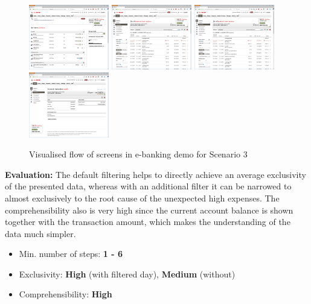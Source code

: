 \begin{figure}[h]
	\begin{center}
		\includegraphics[width=3.5cm]{03_Figures/09_Evaluation/UBS_1_Overview.png}
		\includegraphics[width=3.5cm]{03_Figures/09_Evaluation/UBS_3_AccountTransactions.png}
		\includegraphics[width=3.5cm]{03_Figures/09_Evaluation/UBS_3_AccountTransactions.png}
		\includegraphics[width=3.5cm]{03_Figures/09_Evaluation/UBS_4_AccountTransactionDetails.png}
		\caption{Visualised flow of screens in e-banking demo for Scenario 3}
		\label{fig:scenariothreeebanking}
	\end{center}
\end{figure}

\textbf{Evaluation:} The default filtering helps to directly achieve an average exclusivity of the presented data, whereas with an additional filter it can be narrowed to almost exclusively to the root cause of the unexpected high expenses. The comprehensibility also is very high since the current account balance is shown together with the transaction amount, which makes the understanding of the data much simpler.
\begin{itemize}[noitemsep,nolistsep]
	\item Min. number of steps: \textbf{1 - 6}
	\item Exclusivity: \textbf{High} (with filtered day), \textbf{Medium} (without)
	\item Comprehensibility: \textbf{High}
\end{itemize}


